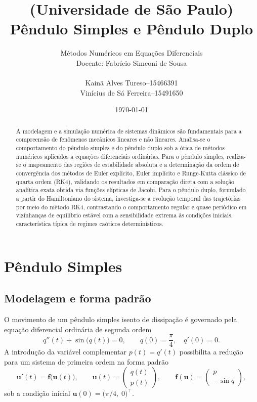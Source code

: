 \documentclass[12pt,a4paper]{article}
\title{(Universidade de São Paulo)\\
Pêndulo Simples e Pêndulo Duplo}
\author{Métodos Numéricos em Equações Diferenciais\\
Docente: Fabrício Simeoni de Sousa\\[.2cm]
\begin{tabular}{r@{\ }c@{\ }l}
    Kainã Alves Tureso      &-- &15466391\\
    Vinícius de Sá Ferreira &-- &15491650
\end{tabular}}
\date{\today}
\newcommand{\bd}[1]{\textbf{#1}} %
\begin{document}
    \maketitle

    \tableofcontents

    \begin{abstract}
        A modelagem e a simulação numérica de sistemas dinâmicos são fundamentais para a compreensão de fenômenos mecânicos lineares e não lineares. Analisa-se o comportamento do pêndulo simples e do pêndulo duplo sob a ótica de métodos numéricos aplicados a equações diferenciais ordinárias. Para o pêndulo simples, realiza-se o mapeamento das regiões de estabilidade absoluta e a determinação da ordem de convergência dos métodos de Euler explícito, Euler implícito e Runge-Kutta clássico de quarta ordem (RK4), validando os resultados em comparação direta com a solução analítica exata obtida via funções elípticas de Jacobi. Para o pêndulo duplo, formulado a partir do Hamiltoniano do sistema, investiga-se a evolução temporal das trajetórias por meio do método RK4, contrastando o comportamento regular e quase periódico em vizinhanças de equilíbrio estável com a sensibilidade extrema às condições iniciais, característica típica de regimes caóticos determinísticos.
    \end{abstract}

    \section{Pêndulo Simples}
    \subsection{Modelagem e forma padrão}
    O movimento de um pêndulo simples isento de dissipação é governado pela equação diferencial ordinária de segunda ordem
    \begin{equation}
        q''(t) + \sin\bigl(q(t)\bigr)=0,\qquad 
        q(0)=\frac{\pi}{4},\quad q'(0)=0.
    \end{equation}
    A introdução da variável complementar $p(t)=q'(t)$ possibilita a redução para um sistema de primeira ordem na forma padrão
    \begin{equation}
        \bd{u}'(t)=\bd{f}\bigl(\bd{u}(t)\bigr),\qquad
        \bd{u}(t)=\begin{pmatrix} q(t)\\ p(t) \end{pmatrix},\qquad
        \bd{f}(\bd{u})=\begin{pmatrix} p\\ -\sin q \end{pmatrix},
    \end{equation}
    sob a condição inicial $\bd{u}(0)=\bigl(\pi/4,\;0\bigr)^\top$.
\end{document}
